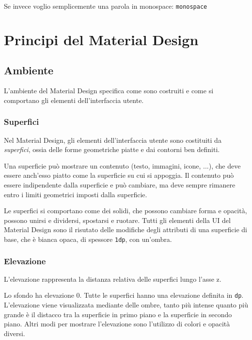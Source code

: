 \documentclass[12pt, a4paper]{report}
\begin{document}
	Se invece voglio semplicemente una parola in monospace: \texttt{monospace}



\chapter{Principi del Material Design}

	\section{Ambiente}
	L'ambiente del Material Design  \cite{environment} specifica come sono costruiti e come si comportano gli elementi dell'interfaccia utente.

		\subsection{Superfici}
		Nel Material Design, gli elementi dell'interfaccia utente sono costituiti da \textit{superfici}, ossia delle forme geometriche piatte e dai contorni ben definiti.

		Una superficie può mostrare un contenuto (testo, immagini, icone, ...), che deve essere anch'esso piatto come la superficie su cui si appoggia. Il contenuto può essere indipendente dalla superficie e può cambiare, ma deve sempre rimanere entro i limiti geometrici imposti dalla superficie.

		
		Le superfici si comportano come dei solidi, che possono cambiare forma e opacità, possono unirsi e dividersi, spostarsi e ruotare. Tutti gli elementi della UI del Material Design sono il risutato delle modifiche degli attributi di una superficie di base, che è bianca opaca, di spessore \texttt{1dp}, con un'ombra.
		

		\subsection{Elevazione}
		L'elevazione rappresenta la distanza relativa delle superfici lungo l'asse z.

		Lo sfondo ha elevazione 0. Tutte le superfici hanno una elevazione definita in \texttt{dp}. L'elevazione viene visualizzata mediante delle ombre, tanto più intense quanto più grande è il distacco tra la superficie in primo piano e la superficie in secondo piano. Altri modi per mostrare l'elevazione sono l'utilizzo di colori e opacità diversi.
\end{document}
